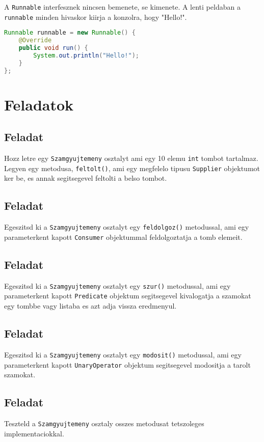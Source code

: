 \documentclass{article}
\let\l\lstinline
\begin{document}
A \l{Runnable} interfesznek nincsen bemenete, se kimenete. A lenti peldaban a \l{runnable} minden hivaskor kiirja a konzolra, hogy "Hello!".

\begin{lstlisting}[language=Java, caption=Pelda Function]
Runnable runnable = new Runnable() {
	@Override
	public void run() {
		System.out.println("Hello!");
	}
};
\end{lstlisting}

\section{Feladatok}

\subsection{Feladat}

Hozz letre egy \l{Szamgyujtemeny} osztalyt ami egy 10 elemu \l{int} tombot tartalmaz. Legyen egy metodusa, \l{feltolt()}, ami egy megfelelo tipusu \l{Supplier} objektumot ker be, es annak segitsegevel feltolti a belso tombot.

\subsection{Feladat}

Egeszitsd ki a \l{Szamgyujtemeny} osztalyt egy \l{feldolgoz()} metodussal, ami egy parameterkent kapott \l{Consumer} objektummal feldolgoztatja a tomb elemeit.

\subsection{Feladat}

Egeszitsd ki a \l{Szamgyujtemeny} osztalyt egy \l{szur()} metodussal, ami egy parameterkent kapott \l{Predicate} objektum segitsegevel kivalogatja a szamokat egy tombbe vagy listaba es azt adja vissza eredmenyul.

\subsection{Feladat}

Egeszitsd ki a \l{Szamgyujtemeny} osztalyt egy \l{modosit()} metodussal, ami egy parameterkent kapott \l{UnaryOperator} objektum segitsegevel modositja a tarolt szamokat.

\subsection{Feladat}

Teszteld a \l{Szamgyujtemeny} osztaly osszes metodusat tetszoleges implementaciokkal.
\end{document}
